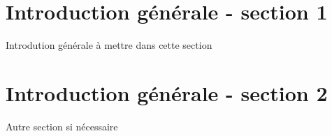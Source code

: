 \section*{Introduction générale - section 1}

Introdution générale à mettre dans cette section
 

\section*{Introduction générale - section 2}

Autre section si nécessaire
